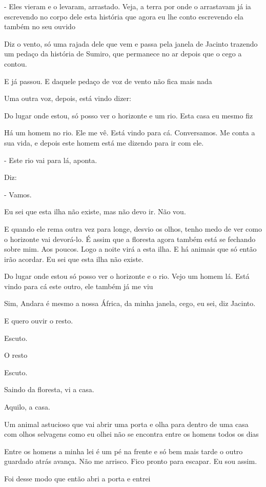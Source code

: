 - Eles vieram e o levaram, arrastado. Veja, a terra por onde o
arrastavam já ia escrevendo no corpo dele esta história que agora eu lhe
conto escrevendo ela também no seu ouvido

Diz o vento, só uma rajada dele que vem e passa pela janela de Jacinto
trazendo um pedaço da história de Sumiro, que permanece no ar depois que
o cego a contou.

E já passou. E daquele pedaço de voz de vento não fica mais nada

Uma outra voz, depois, está vindo dizer:

Do lugar onde estou, só posso ver o horizonte e um rio. Esta casa eu
mesmo fiz

Há um homem no rio. Ele me vê. Está vindo para cá. Conversamos. Me conta
a sua vida, e depois este homem está me dizendo para ir com ele.

- Este rio vai para lá, aponta.

Diz:

- Vamos.

Eu sei que esta ilha não existe, mas não devo ir. Não vou.

E quando ele rema outra vez para longe, desvio os olhos, tenho medo de
ver como o horizonte vai devorá-lo. É assim que a floresta agora também
está se fechando sobre mim. Aos poucos. Logo a noite virá a esta ilha. E
há animais que só então irão acordar. Eu sei que esta ilha não existe.

Do lugar onde estou só posso ver o horizonte e o rio. Vejo um homem lá.
Está vindo para cá este outro, ele também já me viu

Sim, Andara é mesmo a nossa África, da minha janela, cego, eu sei, diz
Jacinto.

E quero ouvir o resto.

Escuto.

O resto

Escuto.

Saindo da floresta, vi a casa.

Aquilo, a casa.

Um animal astucioso que vai abrir uma porta e olha para dentro de uma
casa com olhos selvagens como eu olhei não se encontra entre os homens
todos os dias

Entre os homens a minha lei é um pé na frente e só bem mais tarde o
outro guardado atrás avança. Não me arrisco. Fico pronto para escapar.
Eu sou assim.

Foi desse modo que então abri a porta e entrei

